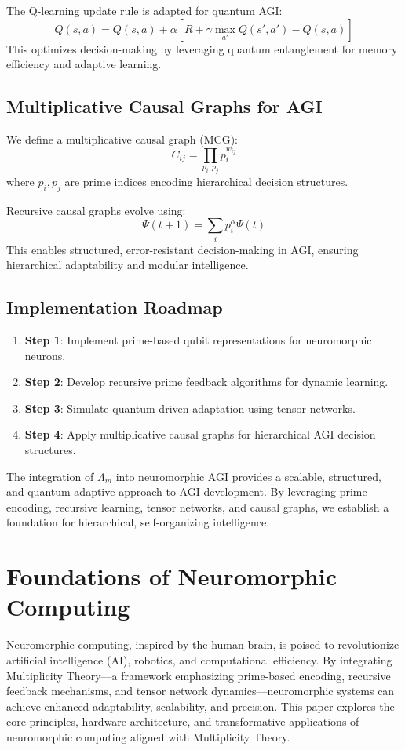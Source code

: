 \documentclass{article}
\theoremstyle{plain}
\begin{document}
The Q-learning update rule is adapted for quantum AGI:
\begin{equation}
Q(s, a) = Q(s, a) + \alpha \left[ R + \gamma \max_{a'} Q(s', a') - Q(s, a) \right]
\end{equation}
This optimizes decision-making by leveraging quantum entanglement for memory efficiency and adaptive learning.

\subsection{Multiplicative Causal Graphs for AGI}
We define a multiplicative causal graph (MCG):
\begin{equation}
C_{ij} = \prod_{p_i, p_j} p_i^{w_{ij}}
\end{equation}
where $p_i, p_j$ are prime indices encoding hierarchical decision structures.

Recursive causal graphs evolve using:
\begin{equation}
\Psi(t+1) = \sum_i p_i^\alpha \Psi(t)
\end{equation}
This enables structured, error-resistant decision-making in AGI, ensuring hierarchical adaptability and modular intelligence.

\subsection{Implementation Roadmap}
\begin{enumerate}
    \item \textbf{Step 1}: Implement prime-based qubit representations for neuromorphic neurons.
    \item \textbf{Step 2}: Develop recursive prime feedback algorithms for dynamic learning.
    \item \textbf{Step 3}: Simulate quantum-driven adaptation using tensor networks.
    \item \textbf{Step 4}: Apply multiplicative causal graphs for hierarchical AGI decision structures.
\end{enumerate}

The integration of $\Lambda_m$ into neuromorphic AGI provides a scalable, structured, and quantum-adaptive approach to AGI development. By leveraging prime encoding, recursive learning, tensor networks, and causal graphs, we establish a foundation for hierarchical, self-organizing intelligence.

\section{Foundations of Neuromorphic Computing}
Neuromorphic computing, inspired by the human brain, is poised to revolutionize artificial intelligence (AI), robotics, and computational efficiency. By integrating Multiplicity Theory—a framework emphasizing prime-based encoding, recursive feedback mechanisms, and tensor network dynamics—neuromorphic systems can achieve enhanced adaptability, scalability, and precision. This paper explores the core principles, hardware architecture, and transformative applications of neuromorphic computing aligned with Multiplicity Theory.
\end{document}
